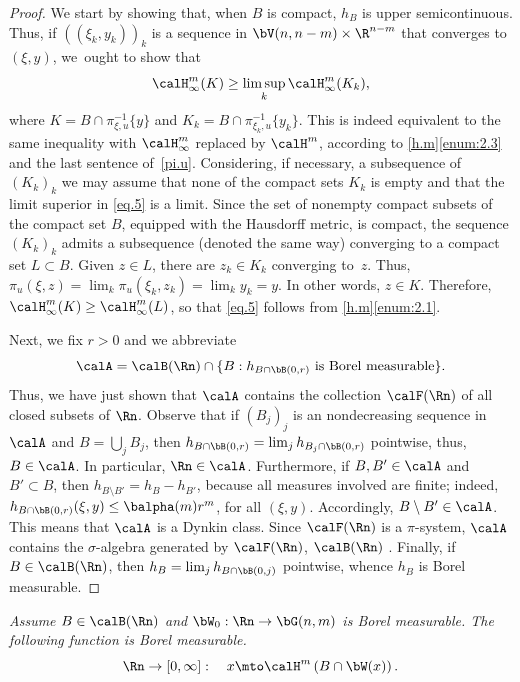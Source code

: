 \begin{proof}
We start by showing that, when $B$ is compact, $h_{B}$ is upper semicontinuous.
Thus, if $((\xi_k,y_k))_k$ is a sequence in $\bV(n,n-m) \times \R^{n-m}$ that converges to $(\xi,y)$, we~ought to show that
\begin{equation}
\label{eq.5}
\calH^m_\infty(K) \geq \limsup_k \calH^m_\infty(K_k),
\end{equation}
where $K = B \cap \pi_{\xi,u}^{-1}\{y\}$ and $K_k = B \cap \pi_{\xi_k,u}^{-1}\{y_k\}$.
This is indeed equivalent to the same inequality with $\calH^m_\infty$ replaced by $\calH^m$, according to \ref{h.m}\eqref{enum:2.3} and the last sentence of~\ref{pi.u}.
Considering, if necessary, a subsequence of $(K_k)_k$ we may assume that none of the compact sets $K_k$ is empty and that the limit superior in \eqref{eq.5} is a limit.
Since the set of nonempty compact subsets of the compact set $B$, equipped with the Hausdorff metric, is compact, the sequence $(K_k)_k$ admits a subsequence (denoted the same way) converging to a compact set $L \subset B$.
Given $z \in L$, there are $z_k \in K_k$ converging to~$z$.
Thus, $\pi_u(\xi,z) = \lim_k \pi_u(\xi_k,z_k) = \lim_k y_k = y$.
In other words, $z \in K$.
Therefore, $\calH^m_\infty(K) \geq \calH^m_\infty(L)$, so that \eqref{eq.5} follows from \ref{h.m}\eqref{enum:2.1}.
\par
Next, we fix $r > 0$ and we abbreviate
\[
\calA = \calB(\Rn) \cap \{ B: h_{B \cap \bB(0,r)} \text{ is Borel measurable}\}.
\]
Thus, we have just shown that $\calA$ contains the collection $\calF(\Rn)$ of all closed subsets of $\Rn$.
Observe that if $(B_j)_j$ is an nondecreasing sequence in $\calA$ and $B = \bigcup_j B_j$, then $h_{B \cap \bB(0,r)} = \lim_j h_{B_j \cap \bB(0,r)}$ pointwise, thus, $B \in \calA$.
In particular, $\Rn \in \calA$.
Furthermore, if $B,B' \in \calA$ and $B' \subset B$, then $h_{B \setminus B'} = h_{B} - h_{B'}$, because all measures involved are finite; indeed, $h_{B \cap \bB(0,r)}(\xi,y) \leq \balpha(m)r^m$, for all $(\xi,y)$.
Accordingly, \hbox{$B \setminus B' \in \calA$}.
This means that $\calA$ is a Dynkin class.
Since $\calF(\Rn)$ is a $\pi$-system, $\calA$ contains the $\sigma$-algebra generated by $\calF(\Rn)$, \ie $\calB(\Rn)$ \cite[Th.\,1.6.2]{COHN}.
Finally, if $B \in \calB(\Rn)$, then $h_B = \lim_j h_{B \cap \bB(0,j)}$ pointwise, whence $h_B$ is Borel measurable.
\end{proof}

\begin{Empty}[]
\label{second.measurability}
{\it
Assume $B \in \calB(\Rn)$ and $\bW_0: \Rn \to \bG(n,m)$ is Borel measurable. The fol\-low\-ing function is Borel measurable.
\begin{equation*}
\Rn \to [0,\infty]:\quad x \mto \calH^m\left(B \cap \bW(x) \right).
\end{equation*}
}
\end{Empty}

